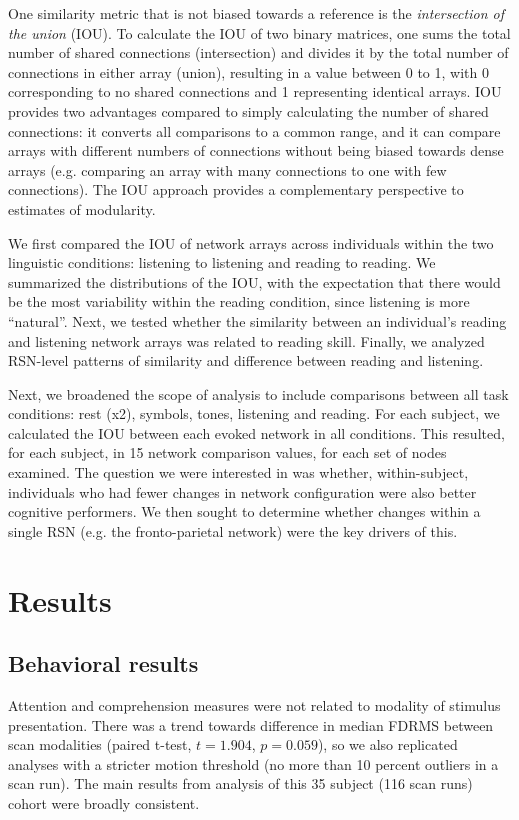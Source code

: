 One similarity metric that is not biased towards a reference is the \textit{intersection of the union} (IOU). To calculate the IOU of two binary matrices, one sums the total number of shared connections (intersection) and divides it by the total number of connections in either array (union), resulting in a value between 0 to 1, with 0 corresponding to no shared connections and 1 representing identical arrays. IOU provides two advantages compared to simply calculating the number of shared connections: it converts all comparisons to a common range, and it can compare arrays with different numbers of connections without being biased towards dense arrays (e.g. comparing an array with many connections to one with few connections). The IOU approach provides a complementary perspective to estimates of modularity.

We first compared the IOU of network arrays across individuals within the two linguistic conditions: listening to listening and reading to reading. We summarized the distributions of the IOU, with the expectation that there would be the most variability within the reading condition, since listening is more ``natural''. Next, we tested whether the similarity between an individual's reading and listening network arrays was related to reading skill. Finally, we analyzed RSN-level patterns of similarity and difference between reading and listening. 

Next, we broadened the scope of analysis to include comparisons between all task conditions: rest (x2), symbols, tones, listening and reading. For each subject, we calculated the IOU between each evoked network in all conditions. This resulted, for each subject, in 15 network comparison values, for each set of nodes examined. The question we were interested in was whether, within-subject, individuals who had fewer changes in network configuration were also better cognitive performers. We then sought to determine whether changes within a single RSN (e.g. the fronto-parietal network) were the key drivers of this. 


\section{Results}

\subsection{Behavioral results}

Attention and comprehension measures were not related to modality of stimulus presentation. There was a trend towards difference in median FDRMS between scan modalities (paired t-test, $t = 1.904$, $p = 0.059$), so we also replicated analyses with a stricter motion threshold (no more than 10 percent outliers in a scan run). The main results from analysis of this 35 subject (116 scan runs) cohort were broadly consistent.

